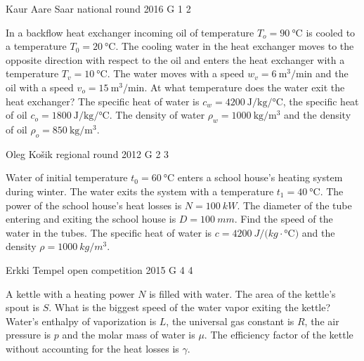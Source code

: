 \documentclass[11pt]{article}
\begin{document}
{Kaur Aare Saar} %
{national round} %
{2016} %
{G 1} %
{2} %
{

\ifEngStatement
In a backflow heat exchanger incoming oil of temperature $T_{o}=\SI{90}{\celsius}$ is cooled to a temperature $T_{0}=\SI{20}{\celsius}$. The cooling water in the heat exchanger moves to the opposite direction with respect to the oil and enters the heat exchanger with a temperature $T_{v}=\SI{10}{\celsius}$. The water moves with a speed $w_{v}=\SI{6}{\m^3\per\minute}$ and the oil with a speed $v_{o}=\SI{15}{\m^3\per\minute}$. At what temperature does the water exit the heat exchanger? The specific heat of water is $c_{w}=\SI{4200}{\joule\per\kilogram\per\celsius}$, the specific heat of oil $c_{o}=\SI{1800}{\joule\per\kilogram\per\celsius}$. The density of water $\rho_{w}=\SI{1000}{\kilogram\per\metre\cubed}$ and the density of oil $\rho_{o}=\SI{850}{\kilogram\per\metre\cubed}$.
\fi
}

{Oleg Košik} %
{regional round} %
{2012} %
{G 2} %
{3} %
{

\ifEngStatement
Water of initial temperature $t_0=\SI{60}{\celsius}$ enters a school house’s heating system during winter. The water exits the system with a temperature $t_1=\SI{40}{\celsius}$. The power of the school house’s heat losses is $N=\SI{100}{kW}$. The diameter of the tube entering and exiting the school house is $D=\SI{100}{mm}$. Find the speed of the water in the tubes. The specific heat of water is $c=\SI{4200}{J/(kg\cdot\celsius)}$ and the density $\rho=\SI{1000}{kg/m^3}$.
\fi
}

{Erkki Tempel} %
{open competition} %
{2015} %
{G 4} %
{4} %
{

\ifEngStatement
A kettle with a heating power $N$ is filled with water. The area of the kettle’s spout is $S$. What is the biggest speed of the water vapor exiting the kettle? Water’s enthalpy of vaporization is $L$, the universal gas constant is $R$, the air pressure is $p$ and the molar mass of water is $\mu$. The efficiency factor of the kettle without accounting for the heat losses is $\gamma$.
\fi
}
\end{document}
